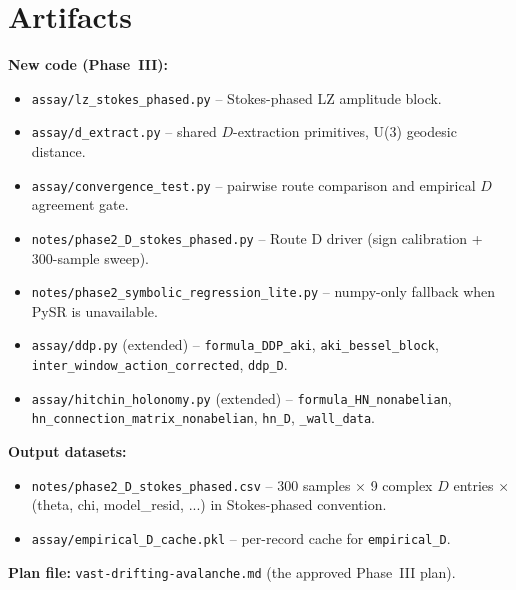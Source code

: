 \documentclass[11pt]{article}
\begin{document}
\section{Artifacts}

\textbf{New code (Phase~III):}
\begin{itemize}
 \item \texttt{assay/lz\_stokes\_phased.py} -- Stokes-phased LZ amplitude block.
 \item \texttt{assay/d\_extract.py} -- shared $D$-extraction primitives,
 U(3) geodesic distance.
 \item \texttt{assay/convergence\_test.py} -- pairwise route comparison
 and empirical $D$ agreement gate.
 \item \texttt{notes/phase2\_D\_stokes\_phased.py} -- Route D driver
 (sign calibration + 300-sample sweep).
 \item \texttt{notes/phase2\_symbolic\_regression\_lite.py} -- numpy-only
 fallback when PySR is unavailable.
 \item \texttt{assay/ddp.py} (extended) -- \texttt{formula\_DDP\_aki},
 \texttt{aki\_bessel\_block}, \texttt{inter\_window\_action\_corrected},
 \texttt{ddp\_D}.
 \item \texttt{assay/hitchin\_holonomy.py} (extended) --
 \texttt{formula\_HN\_nonabelian}, \texttt{hn\_connection\_matrix\_nonabelian},
 \texttt{hn\_D}, \texttt{\_wall\_data}.
\end{itemize}

\textbf{Output datasets:}
\begin{itemize}
 \item \texttt{notes/phase2\_D\_stokes\_phased.csv} -- 300 samples × 9
 complex $D$ entries × (theta, chi, model\_resid, ...) in Stokes-phased
 convention.
 \item \texttt{assay/empirical\_D\_cache.pkl} -- per-record cache for
 \texttt{empirical\_D}.
\end{itemize}

\textbf{Plan file:} \texttt{vast-drifting-avalanche.md} (the approved
Phase~III plan).
\end{document}

